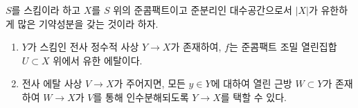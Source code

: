 \begin{lemma}
\label{lemma-there-is-a-scheme-integral-over-refined}
$S$를 스킴이라 하고 $X$를 $S$ 위의 준콤팩트이고 준분리인
대수공간으로서 $|X|$가 유한하게 많은 기약성분을 갖는 것이라 하자.
\begin{enumerate}
\item $Y$가 스킴인 전사 정수적 사상 $Y \to X$가 존재하여,
$f$는 준콤팩트 조밀 열린집합 $U \subset X$ 위에서 유한 에탈이다.
\item 전사 에탈 사상 $V \to X$가 주어지면, 모든 $y \in Y$에 대하여
열린 근방 $W \subset Y$가 존재하여 $W \to X$가 $V$를 통해
인수분해되도록 $Y \to X$를 택할 수 있다.
\end{enumerate}
\end{lemma}

